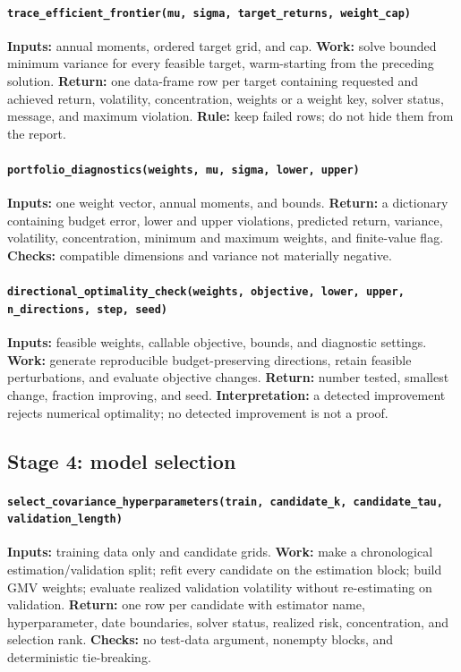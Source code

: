 \documentclass[10pt]{article}
\begin{document}
\begin{sloppypar}
\paragraph{\texttt{trace\_efficient\_frontier(mu, sigma, target\_returns,
weight\_cap)}}
\textbf{Inputs:} annual moments, ordered target grid, and cap.
\textbf{Work:} solve bounded minimum variance for every feasible target,
warm-starting from the preceding solution.
\textbf{Return:} one data-frame row per target containing requested and achieved
return, volatility, concentration, weights or a weight key, solver status,
message, and maximum violation. \textbf{Rule:} keep failed rows; do not hide
them from the report.

\paragraph{\texttt{portfolio\_diagnostics(weights, mu, sigma, lower, upper)}}
\textbf{Inputs:} one weight vector, annual moments, and bounds.
\textbf{Return:} a dictionary containing budget error, lower and upper
violations, predicted return, variance, volatility, concentration, minimum and
maximum weights, and finite-value flag.
\textbf{Checks:} compatible dimensions and variance not materially negative.

\paragraph{\texttt{directional\_optimality\_check(weights, objective, lower,
upper, n\_directions, step, seed)}}
\textbf{Inputs:} feasible weights, callable objective, bounds, and diagnostic
settings. \textbf{Work:} generate reproducible budget-preserving directions,
retain feasible perturbations, and evaluate objective changes.
\textbf{Return:} number tested, smallest change, fraction improving, and seed.
\textbf{Interpretation:} a detected improvement rejects numerical optimality;
no detected improvement is not a proof.

\subsection*{Stage 4: model selection}

\paragraph{\texttt{select\_covariance\_hyperparameters(train, candidate\_k,
candidate\_tau, validation\_length)}}
\textbf{Inputs:} training data only and candidate grids.
\textbf{Work:} make a chronological estimation/validation split; refit every
candidate on the estimation block; build GMV weights; evaluate realized
validation volatility without re-estimating on validation.
\textbf{Return:} one row per candidate with estimator name, hyperparameter,
date boundaries, solver status, realized risk, concentration, and selection
rank. \textbf{Checks:} no test-data argument, nonempty blocks, and deterministic
tie-breaking.


\end{sloppypar}
\end{document}
